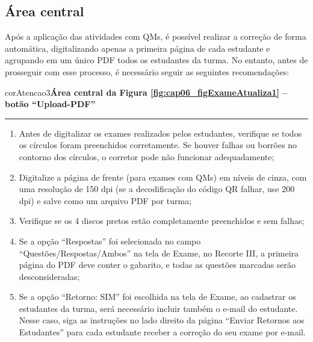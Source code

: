 \subsection{Área central}\label{sec:areaCentral}

Após a aplicação das atividades com QMs, é possível realizar a correção de forma automática, digitalizando apenas a primeira página de cada estudante e agrupando em um único PDF todos os estudantes da turma. No entanto, antes de prosseguir com esse processo, é necessário seguir as seguintes recomendações:

\begin{myboxCode}{corAtencao3}{\textbf{Área central da Figura \ref{fig:cap06_figExameAtualiza1} -- botão ``Upload-PDF''}}\\\vspace{-3mm}\hrule\vspace{1mm}
{\footnotesize
\begin{enumerate}[itemsep=-1mm]
    \item Antes de digitalizar os exames realizados pelos estudantes, verifique se todos os círculos foram preenchidos corretamente. Se houver falhas ou borrões no contorno dos círculos, o corretor pode não funcionar adequadamente;
    \item Digitalize a página de frente (para exames com QMs) em níveis de cinza, com uma resolução de 150 dpi (se a decodificação do código QR falhar, use 200 dpi) e salve como um arquivo PDF por turma;
    \item Verifique se os 4 discos pretos estão completamente preenchidos e sem falhas;
    \item Se a opção ``Respostas'' foi selecionada no campo ``Questões/Respostas/Ambos'' na tela de Exame, no Recorte III, a primeira página do PDF deve conter o gabarito, e todas as questões marcadas serão desconsideradas;
    \item Se a opção ``Retorno: SIM'' foi escolhida na tela de Exame, ao cadastrar os estudantes da turma, será necessário incluir também o e-mail do estudante. Nesse caso, siga as instruções no lado direito da página ``Enviar Retornos aos Estudantes'' para cada estudante receber a correção do seu exame por e-mail.
\end{enumerate}
}
\end{myboxCode}


